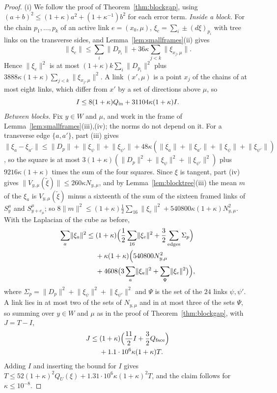 \documentclass[11pt]{amsart}
\theoremstyle{definition}
\theoremstyle{remark}
\numberwithin{equation}{section}
\begin{document}
\begin{proof}
(i) We follow the proof of Theorem~\ref{thm:blockgap}, using
$(a+b)^2\le(1+\kappa)a^2+(1+\kappa^{-1})b^2$ for each error term.
\emph{Inside a block.} For the chain $p_1,\dots,p_k$ of an active link
$e=(x_0,\mu)$, $\xi_e=\sum_i\pm(d\xi)_{p_i}$ with tree links on the
transverse sides, and Lemma~\ref{lem:smallframes}(ii) gives
\[
\lVert\xi_e\rVert\le\sum_i\lVert D_{p_i}\rVert+36\kappa\sum_{j<k}\lVert
\xi_{x_j,\mu}\rVert .
\]
Hence $\lVert\xi_e\rVert^2$ is at most $(1+\kappa)k\sum_i\lVert D_{p_i}
\rVert^2$ plus $3888\kappa(1+\kappa)\sum_{j<k}\lVert\xi_{x_j,\mu}\rVert^2$.
A link
$(x',\mu)$ is a point $x_j$ of the chains of at most eight links, which
differ from $x'$ by a set of directions above $\mu$, so
\[
I\le8(1+\kappa)Q_{\rm in}+31104\kappa(1+\kappa)I .
\]
\emph{Between blocks.} Fix $y\in W$ and $\mu$, and work in the frame of
Lemma~\ref{lem:smallframes}(iii),(iv); the norms do not depend on it. For a
transverse edge $\{a,a'\}$, part (iii) gives $\lVert\xi_a-\xi_{a'}\rVert\le
\lVert D_p\rVert+\lVert\xi_\psi\rVert+\lVert\xi_{\psi'}\rVert+48\kappa(
\lVert\xi_a\rVert+\lVert\xi_{a'}\rVert+\lVert\xi_\psi\rVert+\lVert
\xi_{\psi'}\rVert)$, so the square is at most $3(1+\kappa)(\lVert D_p
\rVert^2+\lVert\xi_\psi\rVert^2+\lVert\xi_{\psi'}\rVert^2)$ plus $9216\kappa
(1+\kappa)$ times the sum of the four squares. Since $\xi$ is tangent, part
(iv) gives $\lVert V_{y,\mu}(\tilde\xi)\rVert\le260\kappa N_{y,\mu}$, and
by Lemma~\ref{lem:blocktree}(iii) the mean $m$ of the $\xi_a$ is
$V_{y,\mu}(\tilde\xi)$ minus a sixteenth of the sum of the sixteen
framed links of $S^\mu_y$ and $S^\mu_{y+e_\mu}$; so $8\lVert m\rVert^2\le
(1+\kappa)\frac12\sum_{16}\lVert\xi_e\rVert^2+540800\kappa(1+\kappa)
N_{y,\mu}^2$. With the Laplacian of the cube as before,
\[
\begin{split}
\sum_a\lVert\xi_a\rVert^2\le{}&(1+\kappa)\Bigl(\frac12\sum_{16}\lVert\xi_e
\rVert^2+\frac32\sum_{\rm edges}\Sigma_p\Bigr)\\
&+\kappa(1+\kappa)\Bigl(540800N_{y,\mu}^2\\
&+4608\bigl(3\sum_a\lVert\xi_a\rVert^2+\sum_\Psi\lVert\xi_e\rVert^2\bigr)
\Bigr),
\end{split}
\]
where $\Sigma_p=\lVert D_p\rVert^2+\lVert\xi_\psi\rVert^2+\lVert
\xi_{\psi'}\rVert^2$ and $\Psi$ is the set of the $24$ links $\psi,\psi'$. A link lies in at most two of the
sets of $N_{y,\mu}$ and in at most three of the sets $\Psi$, so summing over
$y\in W$ and $\mu$ as in the proof of Theorem~\ref{thm:blockgap}, with
$J=T-I$,
\[
\begin{split}
J\le{}&(1+\kappa)\Bigl(\frac{11}2I+\frac32Q_{\rm face}\Bigr)\\
&+1.1\cdot10^6\kappa(1+\kappa)T .
\end{split}
\]
Adding $I$ and inserting the bound for $I$ gives $T\le52(1+\kappa)^2
Q_U(\xi)+1.31\cdot10^6\kappa(1+\kappa)^2T$, and the claim follows for
$\kappa\le10^{-8}$.


\end{proof}
\end{document}

